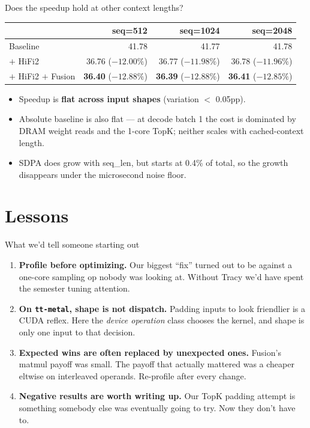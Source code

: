 \documentclass[aspectratio=169,10pt]{beamer}
\begin{document}
\begin{frame}{Does the speedup hold at other context lengths?}
  \small
  \centering
  \begin{tabular}{lrrr}
    \toprule
     & seq=512 & seq=1024 & seq=2048 \\
    \midrule
    Baseline               & 41.78 & 41.77 & 41.78 \\
    $+$ HiFi2              & 36.76 (${-}12.00\%$) & 36.77 (${-}11.98\%$) & 36.78 (${-}11.96\%$) \\
    $+$ HiFi2 $+$ Fusion   & \textbf{36.40} (${-}12.88\%$) & \textbf{36.39} (${-}12.88\%$) & \textbf{36.41} (${-}12.85\%$) \\
    \bottomrule
  \end{tabular}
  \vfill
  \begin{itemize}
    \item Speedup is \textbf{flat across input shapes} (variation $<$ 0.05pp).
    \item Absolute baseline is also flat — at decode batch 1 the cost is
          dominated by DRAM weight reads and the 1-core TopK; neither scales
          with cached-context length.
    \item SDPA does grow with seq\_len, but starts at 0.4\% of total, so
          the growth disappears under the microsecond noise floor.
  \end{itemize}
\end{frame}

\section{Lessons}

\begin{frame}{What we'd tell someone starting out}
  \begin{enumerate}
    \item \textbf{Profile before optimizing.} Our biggest ``fix'' turned
          out to be against a one-core sampling op nobody was looking at.
          Without Tracy we'd have spent the semester tuning attention.
    \item \textbf{On \texttt{tt-metal}, shape is not dispatch.} Padding
          inputs to look friendlier is a CUDA reflex. Here the
          \emph{device operation} class chooses the kernel, and shape is
          only one input to that decision.
    \item \textbf{Expected wins are often replaced by unexpected ones.}
          Fusion's matmul payoff was small. The payoff that actually
          mattered was a cheaper eltwise on interleaved operands.
          Re-profile after every change.
    \item \textbf{Negative results are worth writing up.} Our TopK
          padding attempt is something somebody else was eventually
          going to try. Now they don't have to.
  \end{enumerate}
\end{frame}
\end{document}
